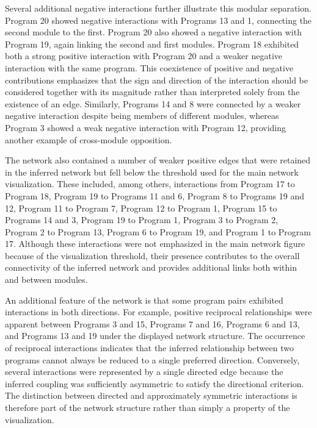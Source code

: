 \documentclass[11pt,a4paper]{article}
\begin{document}
Several additional negative interactions further illustrate this modular separation. Program 20 showed negative interactions with Programs 13 and 1, connecting the second module to the first. Program 20 also showed a negative interaction with Program 19, again linking the second and first modules. Program 18 exhibited both a strong positive interaction with Program 20 and a weaker negative interaction with the same program. This coexistence of positive and negative contributions emphasizes that the sign and direction of the interaction should be considered together with its magnitude rather than interpreted solely from the existence of an edge. Similarly, Programs 14 and 8 were connected by a weaker negative interaction despite being members of different modules, whereas Program 3 showed a weak negative interaction with Program 12, providing another example of cross-module opposition.

The network also contained a number of weaker positive edges that were retained in the inferred network but fell below the threshold used for the main network visualization. These included, among others, interactions from Program 17 to Program 18, Program 19 to Programs 11 and 6, Program 8 to Programs 19 and 12, Program 11 to Program 7, Program 12 to Program 1, Program 15 to Programs 14 and 3, Program 19 to Program 1, Program 3 to Program 2, Program 2 to Program 13, Program 6 to Program 19, and Program 1 to Program 17. Although these interactions were not emphasized in the main network figure because of the visualization threshold, their presence contributes to the overall connectivity of the inferred network and provides additional links both within and between modules.

An additional feature of the network is that some program pairs exhibited interactions in both directions. For example, positive reciprocal relationships were apparent between Programs 3 and 15, Programs 7 and 16, Programs 6 and 13, and Programs 13 and 19 under the displayed network structure. The occurrence of reciprocal interactions indicates that the inferred relationship between two programs cannot always be reduced to a single preferred direction. Conversely, several interactions were represented by a single directed edge because the inferred coupling was sufficiently asymmetric to satisfy the directional criterion. The distinction between directed and approximately symmetric interactions is therefore part of the network structure rather than simply a property of the visualization.
\end{document}
